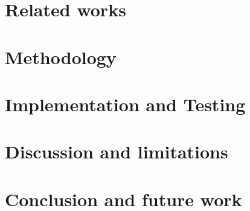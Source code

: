\chapter{Related works}
\chapter{Methodology}
\chapter{Implementation and Testing}
\chapter{Discussion and limitations}
\chapter{Conclusion and future work}